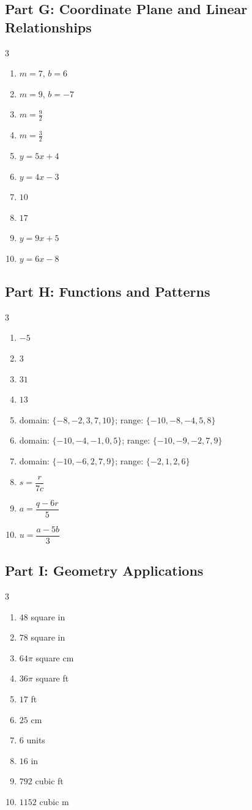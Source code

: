 \documentclass[11pt]{article}
\begin{document}
\subsection*{Part G: Coordinate Plane and Linear Relationships}
\begin{multicols}{3}
\begin{enumerate}
  \item $m = 7$, \quad $b = 6$
  \item $m = 9$, \quad $b = -7$
  \item $m = \frac{9}{2}$
  \item $m = \frac{3}{2}$
  \item $y = 5x + 4$
  \item $y = 4x - 3$
  \item $10$
  \item $17$
  \item $y = 9x + 5$
  \item $y = 6x - 8$
\end{enumerate}
\end{multicols}
\subsection*{Part H: Functions and Patterns}
\begin{multicols}{3}
\begin{enumerate}
  \item $-5$
  \item $3$
  \item $31$
  \item $13$
  \item domain: $\{-8, -2, 3, 7, 10\}$; range: $\{-10, -8, -4, 5, 8\}$
  \item domain: $\{-10, -4, -1, 0, 5\}$; range: $\{-10, -9, -2, 7, 9\}$
  \item domain: $\{-10, -6, 2, 7, 9\}$; range: $\{-2, 1, 2, 6\}$
  \item $s = \dfrac{r}{7c}$
  \item $a = \dfrac{q - 6r}{5}$
  \item $u = \dfrac{a - 5b}{3}$
\end{enumerate}
\end{multicols}
\subsection*{Part I: Geometry Applications}
\begin{multicols}{3}
\begin{enumerate}
  \item $48$ square in
  \item $78$ square in
  \item $64 \pi$ square cm
  \item $36 \pi$ square ft
  \item $17$ ft
  \item $25$ cm
  \item $6$ units
  \item $16$ in
  \item $792$ cubic ft
  \item $1152$ cubic m
\end{enumerate}
\end{multicols}
\end{document}
